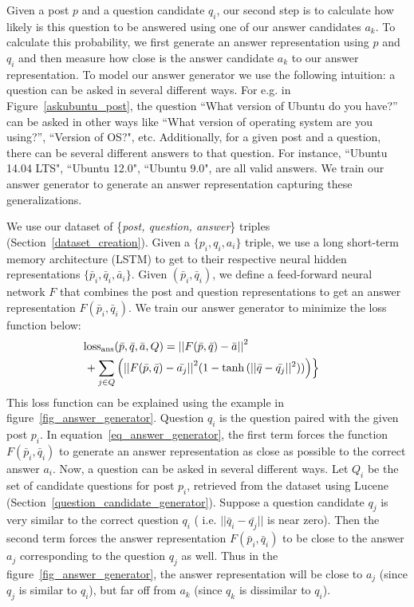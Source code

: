 \documentclass[11pt]{article}
\begin{document}
Given a post $p$ and a question candidate $q_i$, our second step is to calculate how likely is this question to be answered using one of our answer candidates $a_k$. To calculate this probability, we first generate an answer representation using $p$ and $q_i$ and then measure how close is the answer candidate $a_k$ to our answer representation. To model our answer generator we use the following intuition: a question can be asked in several different ways. For e.g. in Figure~\ref{askubuntu_post}, the question ``\textsf{\small What version of Ubuntu do you have?}'' can be asked in other ways like ``\textsf{\small What version of operating system are you using?}'', ``\textsf{\small Version of OS?}", etc.  
Additionally, for a given post and a question, there can be several different answers to that question. For instance, ``\textsf{\small Ubuntu 14.04 LTS}", ``\textsf{\small Ubuntu 12.0}", ``\textsf{\small Ubuntu 9.0}", are all valid answers. We train our answer generator to generate an answer representation capturing these generalizations.

We use our dataset of \{\textit{post, question, answer}\} triples (Section~\ref{dataset_creation}). Given a $\{p_i, q_i, a_i\}$ triple, we use a long short-term memory architecture (LSTM) \cite{hochreiter1997long} to get to their respective neural hidden representations $\{\bar p_i, \bar q_i, \bar a_i\}$.  Given $(\bar p_i, \bar q_i)$, we define a feed-forward neural network $F$ that combines the post and question representations to get an answer representation $F(\bar p_i, \bar q_i)$. We train our answer generator to minimize the loss function below:
%
\begin{align}\label{eq_answer_generator}
  \textrm{loss}_{\textrm{ans}}(\bar p, \bar q, \bar a, Q) 
  &=  {|| F(\bar p, \bar q) - \bar a||}^2 & \\
  &\hspace{-25mm} +  \sum_{j \in Q} \Big ( {|| F(\bar p, \bar q) - \bar{a_j} ||}^2  (1 - \tanh{(|| \bar q - \bar{q_j} ||^2)}) \Big ) \Big \} &\nonumber
\end{align}
%
This loss function can be explained using the example in figure~\ref{fig_answer_generator}. Question $q_i$ is the question paired with the given post $p_i$. In equation~\ref{eq_answer_generator}, the first term forces the function $F(\bar p_i, \bar q_i)$ to generate an answer representation as close as possible to the correct answer $a_i$. Now, a question can be asked in several different ways. Let $Q_i$ be the set of candidate questions for post $p_i$, retrieved from the dataset using Lucene (Section~\ref{question_candidate_generator}). Suppose a question candidate $q_j$ is very similar to the correct question $q_i$ ( i.e. $|| \bar q_i - \bar{q_j} ||$ is near zero). Then the second term forces the answer representation $F(\bar p_i, \bar q_i)$ to be close to the answer $a_j$ corresponding to the question $q_j$ as well. Thus in the figure~\ref{fig_answer_generator}, the answer representation will be close to $a_j$ (since $q_j$ is similar to $q_i$), but far off from $a_k$ (since $q_k$ is dissimilar to $q_i$).
\end{document}
